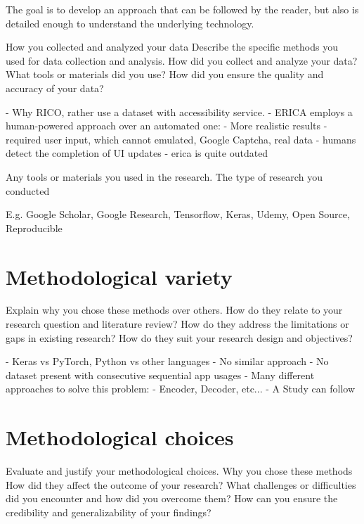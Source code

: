 The goal is to develop an approach that can be followed by the reader, but also is detailed enough to understand the underlying technology.


How you collected and analyzed your data
Describe the specific methods you used for data collection and analysis.
How did you collect and analyze your data?
What tools or materials did you use?
How did you ensure the quality and accuracy of your data?

- Why RICO, rather use a dataset with accessibility service.
- ERICA employs a human-powered approach over an automated one:
    - More realistic results
    - required user input, which cannot emulated, Google Captcha, real data
    - humans detect the completion of UI updates \cite{deka2016erica}
    - erica is quite outdated


Any tools or materials you used in the research.
The type of research you conducted

E.g. Google Scholar, Google Research, Tensorflow, Keras, Udemy, Open Source, Reproducible

\section{Methodological variety}
Explain why you chose these methods over others.
How do they relate to your research question and literature review?
How do they address the limitations or gaps in existing research?
How do they suit your research design and objectives?

- Keras vs PyTorch, Python vs other languages
- No similar approach
- No dataset present with consecutive sequential app usages
- Many different approaches to solve this problem:
    - Encoder, Decoder, etc...
- A Study can follow

\section{Methodological choices}
Evaluate and justify your methodological choices.
Why you chose these methods
How did they affect the outcome of your research?
What challenges or difficulties did you encounter and how did you overcome them?
How can you ensure the credibility and generalizability of your findings?

